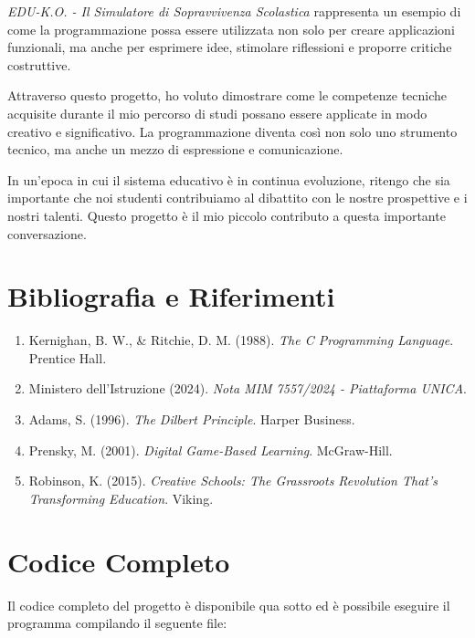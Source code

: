 \documentclass[a4paper,12pt]{article}
\begin{document}
\textit{EDU-K.O. - Il Simulatore di Sopravvivenza Scolastica} rappresenta un esempio di come la programmazione possa essere utilizzata non solo per creare applicazioni funzionali, ma anche per esprimere idee, stimolare riflessioni e proporre critiche costruttive.

Attraverso questo progetto, ho voluto dimostrare come le competenze tecniche acquisite durante il mio percorso di studi possano essere applicate in modo creativo e significativo. La programmazione diventa così non solo uno strumento tecnico, ma anche un mezzo di espressione e comunicazione.

In un'epoca in cui il sistema educativo è in continua evoluzione, ritengo che sia importante che noi studenti contribuiamo al dibattito con le nostre prospettive e i nostri talenti. Questo progetto è il mio piccolo contributo a questa importante conversazione.

\section{Bibliografia e Riferimenti}

\begin{enumerate}
    \item Kernighan, B. W., \& Ritchie, D. M. (1988). \textit{The C Programming Language}. Prentice Hall.
    \item Ministero dell'Istruzione (2024). \textit{Nota MIM 7557/2024 - Piattaforma UNICA}.
    \item Adams, S. (1996). \textit{The Dilbert Principle}. Harper Business.
    \item Prensky, M. (2001). \textit{Digital Game-Based Learning}. McGraw-Hill.
    \item Robinson, K. (2015). \textit{Creative Schools: The Grassroots Revolution That's Transforming Education}. Viking.
\end{enumerate}

\appendix
\section{Codice Completo}

Il codice completo del progetto è disponibile qua sotto ed è possibile eseguire il programma compilando il seguente file:
\end{document}
